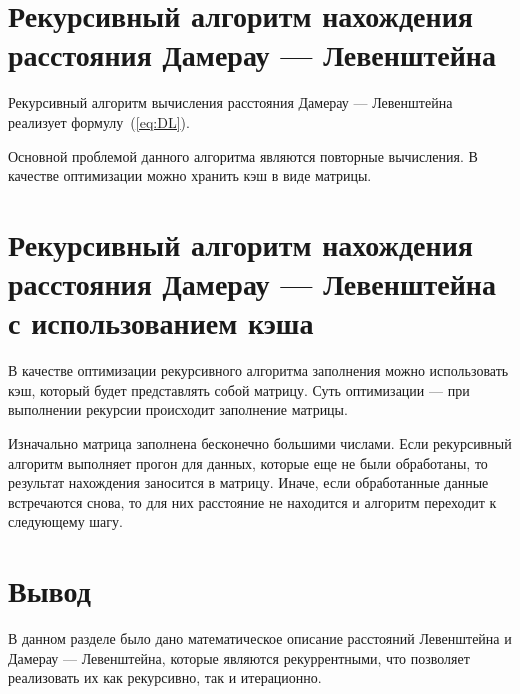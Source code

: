 \section{Рекурсивный алгоритм нахождения расстояния Дамерау --- Левенштейна}
Рекурсивный алгоритм вычисления расстояния Дамерау --- Левенштейна реализует формулу~(\ref{eq:DL}).

Основной проблемой данного алгоритма являются повторные вычисления. В качестве оптимизации можно хранить кэш в виде матрицы.

\section{Рекурсивный алгоритм нахождения расстояния Дамерау --- Левенштейна с использованием кэша}

В качестве оптимизации рекурсивного алгоритма заполнения можно использовать кэш, который будет представлять собой матрицу.
Суть оптимизации --- при выполнении рекурсии происходит
заполнение матрицы.

Изначально матрица заполнена бесконечно большими числами. Если рекурсивный алгоритм выполняет прогон для данных, которые еще
не были обработаны, то результат нахождения заносится в матрицу. Иначе, если обработанные данные встречаются снова, то для них расстояние не
находится и алгоритм переходит к следующему шагу.

\section*{Вывод}

В данном разделе было дано математическое описание расстояний Левенштейна
и Дамерау --- Левенштейна, которые являются рекуррентными, что позволяет
реализовать их как рекурсивно, так и итерационно.

